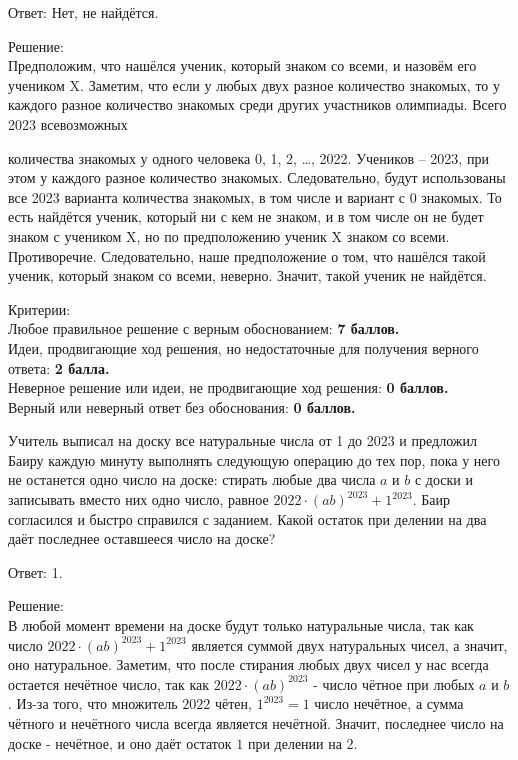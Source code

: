 Ответ: Нет, не найдётся.

Решение:\\
Предположим, что нашёлся ученик, который знаком со всеми, и назовём его учеником X. Заметим, что если у любых двух разное количество знакомых, то у каждого разное количество знакомых среди других участников олимпиады. Всего 2023 всевозможных 

\newpage

\hspace{3mm}

 количества знакомых у одного человека {0, 1, 2, …, 2022}. Учеников – 2023, при этом у каждого разное количество знакомых. Следовательно, будут использованы все 2023 варианта количества знакомых, в том числе и вариант с 0 знакомых. То есть найдётся ученик, который ни с кем не знаком, и в том числе он не будет знаком с учеником X, но по предположению ученик X знаком со всеми. Противоречие. Следовательно, наше предположение о том, что нашёлся такой ученик, который знаком со всеми, неверно. Значит, такой ученик не найдётся. 

\hspace{3mm}

Критерии:\\
Любое правильное решение с верным обоснованием: \textbf{7 баллов.}\\
Идеи, продвигающие ход решения, но недостаточные для получения верного ответа: \textbf{2 балла.}\\
Неверное решение или идеи, не продвигающие ход решения: \textbf{0 баллов.}\\
Верный или неверный ответ без обоснования: \textbf{0 баллов.}

\hspace{3mm}

 Учитель выписал на доску все натуральные числа от 1 до 2023 и предложил Баиру каждую минуту выполнять следующую операцию до тех пор, пока у него не останется одно число на доске: стирать любые два числа $a$ и $b$ с доски и записывать вместо них одно число, равное $2022\cdot(ab)^{2023} + 1^{2023}$. Баир согласился и быстро справился с заданием. Какой остаток при делении на два даёт последнее оставшееся число на доске?

\hspace{3mm}

Ответ: 1.

Решение:\\
В любой момент времени на доске будут только натуральные числа, так как число $2022\cdot(ab)^{2023} + 1^{2023}$ является суммой двух натуральных чисел, а значит, оно натуральное.
Заметим, что после стирания любых двух чисел у нас всегда остается нечётное число, так как $2022\cdot(ab)^{2023}$ - число чётное при любых $a$ и $b$. Из-за того, что множитель $2022$ чётен, $1^{2023} = 1$ число нечётное, а сумма чётного и нечётного числа всегда является нечётной.
Значит, последнее число на доске - нечётное, и оно даёт остаток $1$ при делении на $2$.

